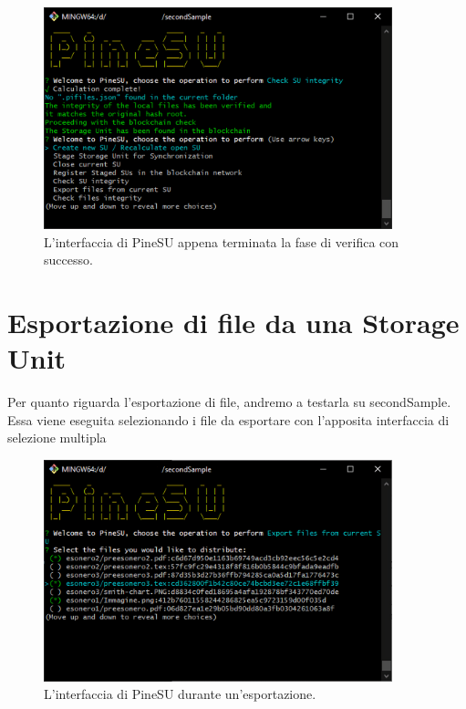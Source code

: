 \begin{figure}[H]
    \centering
    \includegraphics[width=0.9\textwidth]{Figures/verify}
    \caption{\small{
    L'interfaccia di PineSU appena terminata la fase di verifica con successo.
    } %
    } %
    \label{fi:ver}
\end{figure}
\newpage

\section{Esportazione di file da una Storage Unit}
\label{sub:exp}
Per quanto riguarda l'esportazione di file, andremo a testarla su \textsf{secondSample}.
Essa viene eseguita selezionando i file da esportare con l'apposita interfaccia
di selezione multipla
\begin{figure}[H]
    \centering
    \includegraphics[width=0.9\textwidth]{Figures/export}
    \caption{\small{
    L'interfaccia di PineSU durante un'esportazione.
    } %
    } %
    \label{fi:exp}
\end{figure}

